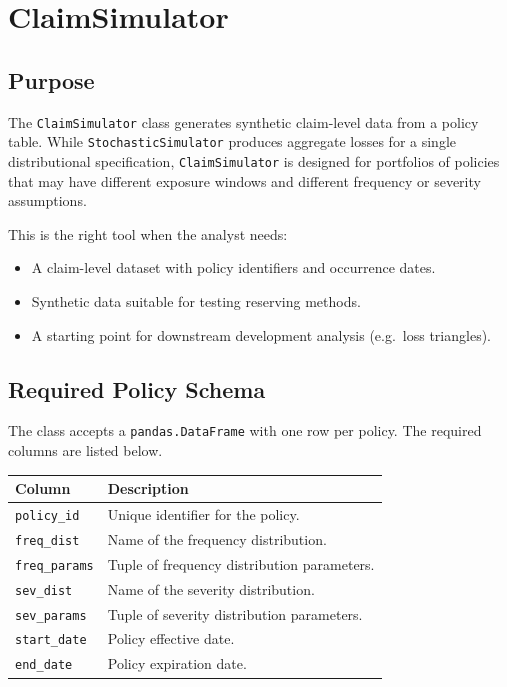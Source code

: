 \chapter{ClaimSimulator}
\label{chap:claim_simulator}

\section{Purpose}

The \texttt{ClaimSimulator} class generates synthetic claim-level data
from a policy table. While \texttt{StochasticSimulator} produces aggregate
losses for a single distributional specification, \texttt{ClaimSimulator}
is designed for portfolios of policies that may have different exposure
windows and different frequency or severity assumptions.

This is the right tool when the analyst needs:

\begin{itemize}[leftmargin=*]
    \item A claim-level dataset with policy identifiers and occurrence
          dates.
    \item Synthetic data suitable for testing reserving methods.
    \item A starting point for downstream development analysis (e.g.\
          loss triangles).
\end{itemize}

\section{Required Policy Schema}

The class accepts a \texttt{pandas.DataFrame} with one row per policy.
The required columns are listed below.

\begin{center}
\begin{tabular}{ll}
\toprule
\textbf{Column} & \textbf{Description} \\
\midrule
\texttt{policy\_id}   & Unique identifier for the policy. \\
\texttt{freq\_dist}   & Name of the frequency distribution. \\
\texttt{freq\_params} & Tuple of frequency distribution parameters. \\
\texttt{sev\_dist}    & Name of the severity distribution. \\
\texttt{sev\_params}  & Tuple of severity distribution parameters. \\
\texttt{start\_date}  & Policy effective date. \\
\texttt{end\_date}    & Policy expiration date. \\
\bottomrule
\end{tabular}
\end{center}

